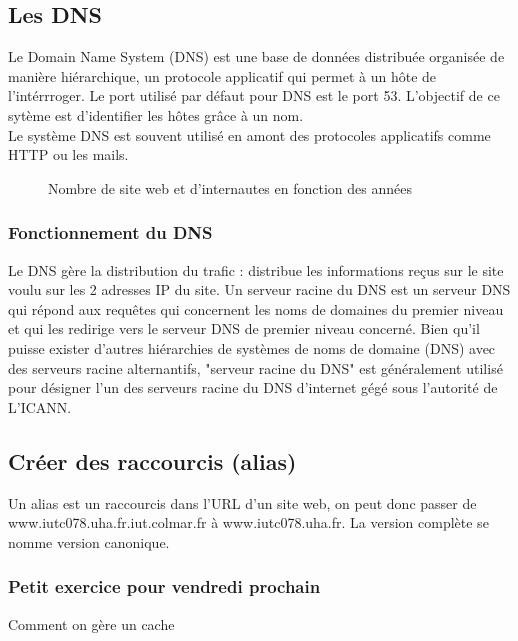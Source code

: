 \documentclass[12pt, a4paper]{article}
\begin{document}
\subsection{Les DNS}
Le Domain Name System (DNS) est une base de données distribuée organisée de manière
hiérarchique, un protocole applicatif qui permet à un hôte de l'intérrroger. Le
port utilisé par défaut pour DNS est le port 53. L'objectif de ce sytème est
d'identifier les hôtes grâce à un nom. \\
Le système DNS est souvent utilisé en amont des protocoles applicatifs comme 
HTTP ou les mails.\\

\begin{figure}[H]
\centering
{}
\caption{Nombre de site web et d'internautes en fonction des années}
\end{figure}
    
    \subsubsection{Fonctionnement du DNS}
    Le DNS gère la distribution du trafic : distribue les informations
    reçus sur le site voulu sur les 2 adresses IP du site.
    Un serveur racine du DNS est un serveur DNS qui répond aux requêtes qui concernent les noms de
    domaines du premier niveau et qui les redirige vers le serveur DNS de premier niveau concerné.
    Bien qu'il puisse exister d'autres hiérarchies de systèmes de noms de domaine (DNS) avec des serveurs
    racine alternantifs, "serveur racine du DNS" est généralement utilisé pour 
    désigner l'un des serveurs racine du DNS d'internet gégé sous l'autorité de L'ICANN.
\newpage 
\subsection{Créer des raccourcis (alias)}
Un alias est un raccourcis dans l'URL d'un site web, on peut donc passer de \\www.iutc078.uha.fr.iut.colmar.fr
à www.iutc078.uha.fr. La version complète se nomme version canonique.

\subsubsection{Petit exercice pour vendredi prochain}
Comment on gère un cache
\end{document}
